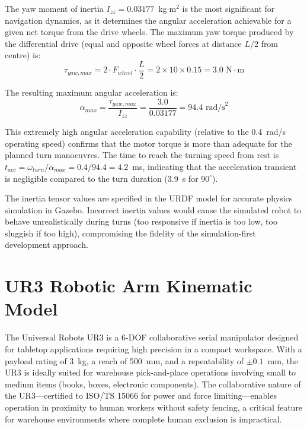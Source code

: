 \documentclass[12pt,a4paper,oneside]{report}
\begin{document}
The yaw moment of inertia $I_{zz} = 0.03177$~kg$\cdot$m$^2$ is the most significant for navigation dynamics, as it determines the angular acceleration achievable for a given net torque from the drive wheels. The maximum yaw torque produced by the differential drive (equal and opposite wheel forces at distance $L/2$ from centre) is:
\begin{equation}
\tau_{yaw,max} = 2 \cdot F_{wheel} \cdot \frac{L}{2} = 2 \times 10 \times 0.15 = 3.0 \text{~N} \cdot \text{m}
\end{equation}

The resulting maximum angular acceleration is:
\begin{equation}
\alpha_{max} = \frac{\tau_{yaw,max}}{I_{zz}} = \frac{3.0}{0.03177} = 94.4 \text{~rad/s}^2
\end{equation}

This extremely high angular acceleration capability (relative to the 0.4~rad/s operating speed) confirms that the motor torque is more than adequate for the planned turn manoeuvres. The time to reach the turning speed from rest is $t_{acc} = \omega_{turn}/\alpha_{max} = 0.4/94.4 = 4.2$~ms, indicating that the acceleration transient is negligible compared to the turn duration (3.9~s for $90^{\circ}$).

The inertia tensor values are specified in the URDF model for accurate physics simulation in Gazebo. Incorrect inertia values would cause the simulated robot to behave unrealistically during turns (too responsive if inertia is too low, too sluggish if too high), compromising the fidelity of the simulation-first development approach.

\section{UR3 Robotic Arm Kinematic Model}

The Universal Robots UR3 is a 6-DOF collaborative serial manipulator designed for tabletop applications requiring high precision in a compact workspace. With a payload rating of 3~kg, a reach of 500~mm, and a repeatability of $\pm 0.1$~mm, the UR3 is ideally suited for warehouse pick-and-place operations involving small to medium items (books, boxes, electronic components). The collaborative nature of the UR3---certified to ISO/TS 15066 for power and force limiting---enables operation in proximity to human workers without safety fencing, a critical feature for warehouse environments where complete human exclusion is impractical.
\end{document}
